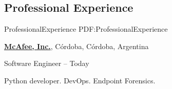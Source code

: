 \documentclass[letterpaper,MMMyyyy,nonstop]{simpleresumecv}
\begin{document}
\begin{body}

%
%


%
%


\section
{Professional \newline
	Experience}
{ProfessionalExperience}
{PDF:ProfessionalExperience}

\href{http://www.mcafee.com}
{\textbf{McAfee, Inc.}},
Córdoba, Córdoba, Argentina

\GapNoBreak
\BulletItem
Software Engineer
\hfill
{} --
Today
\begin{detail}
	\SubBulletItem
	Python developer.
	\SubBulletItem
	DevOps.
	\SubBulletItem
	Endpoint Forensics.
\end{detail}



\end{body}
\end{document}
